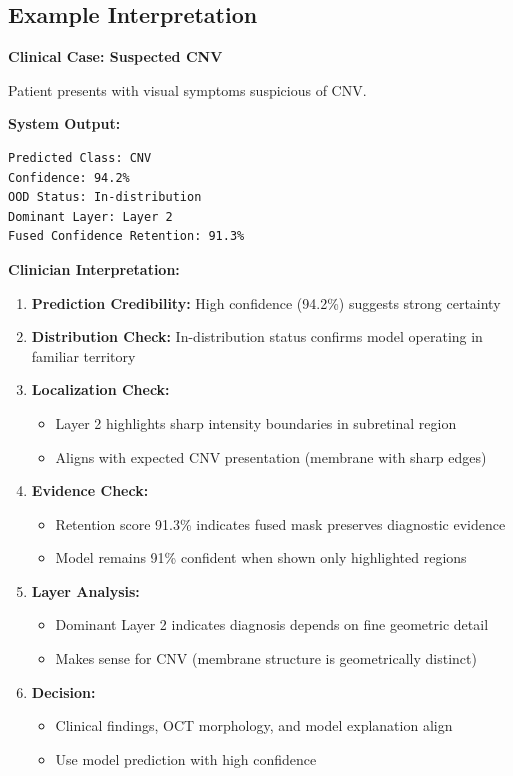 \documentclass[12pt,a4paper,oneside]{book}
\begin{document}
\subsection{Example Interpretation}

\textbf{Clinical Case: Suspected CNV}

Patient presents with visual symptoms suspicious of CNV.

\textbf{System Output:}
\begin{lstlisting}
Predicted Class: CNV
Confidence: 94.2%
OOD Status: In-distribution
Dominant Layer: Layer 2
Fused Confidence Retention: 91.3%
\end{lstlisting}

\textbf{Clinician Interpretation:}

\begin{enumerate}
  \item \textbf{Prediction Credibility:} High confidence (94.2\%) suggests strong certainty
  \item \textbf{Distribution Check:} In-distribution status confirms model operating in familiar territory
  \item \textbf{Localization Check:}
    \begin{itemize}
      \item Layer 2 highlights sharp intensity boundaries in subretinal region
      \item Aligns with expected CNV presentation (membrane with sharp edges)
    \end{itemize}
  \item \textbf{Evidence Check:}
    \begin{itemize}
      \item Retention score 91.3\% indicates fused mask preserves diagnostic evidence
      \item Model remains 91\% confident when shown only highlighted regions
    \end{itemize}
  \item \textbf{Layer Analysis:}
    \begin{itemize}
      \item Dominant Layer 2 indicates diagnosis depends on fine geometric detail
      \item Makes sense for CNV (membrane structure is geometrically distinct)
    \end{itemize}
  \item \textbf{Decision:}
    \begin{itemize}
      \item Clinical findings, OCT morphology, and model explanation align
      \item Use model prediction with high confidence
    \end{itemize}
\end{enumerate}
\end{document}
